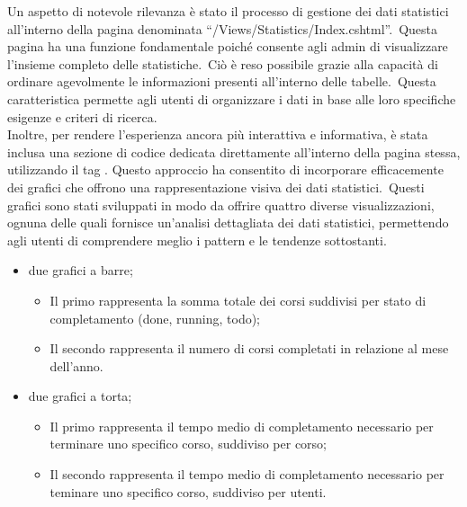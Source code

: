 %		
%
Un aspetto di notevole rilevanza è stato il processo di gestione dei dati statistici all'interno della pagina denominata 
``/Views/Statistics/Index.cshtml''.\ Questa pagina ha una funzione fondamentale poiché consente agli admin di visualizzare 
l'insieme completo delle statistiche.\ Ciò è reso possibile grazie alla capacità di ordinare agevolmente le informazioni 
presenti all'interno delle tabelle.\ Questa caratteristica permette agli utenti di organizzare i dati in base alle loro 
specifiche esigenze e criteri di ricerca.
\\
Inoltre, per rendere l'esperienza ancora più interattiva e informativa, è stata inclusa una sezione di codice dedicata 
direttamente all'interno della pagina stessa, utilizzando il tag . Questo approccio ha 
consentito di incorporare efficacemente dei grafici che offrono una rappresentazione visiva dei dati statistici.\ 
Questi grafici sono stati sviluppati in modo da offrire quattro diverse visualizzazioni, ognuna delle quali fornisce un'analisi 
dettagliata dei dati statistici, permettendo agli utenti di comprendere meglio i pattern e le tendenze sottostanti.
\begin{itemize}
	\item due grafici a barre;
	\begin{itemize}
		\item Il primo rappresenta la somma totale dei corsi suddivisi per stato di completamento (done, running, todo);
		\item Il secondo rappresenta il numero di corsi completati in relazione al mese dell'anno.
	\end{itemize}
	\item due grafici a torta;
	\begin{itemize}
		\item Il primo rappresenta il tempo medio di completamento necessario per terminare uno specifico corso, suddiviso per corso;
		\item Il secondo rappresenta il tempo medio di completamento necessario per teminare uno specifico corso, suddiviso per utenti.
	\end{itemize}
\end{itemize}
